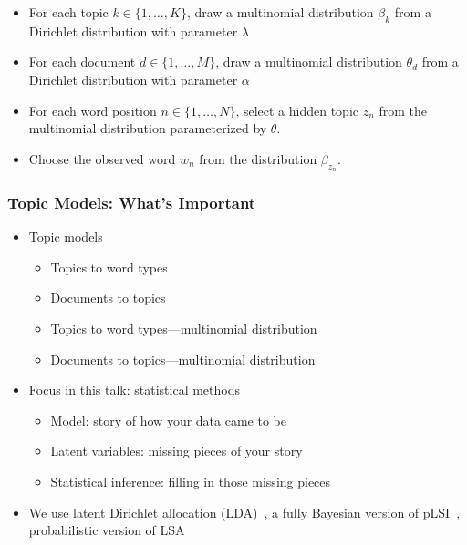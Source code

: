 {\begin{itemize}
\item<1-> For each topic $k \in \{1, \dots, K\}$, draw a multinomial distribution $\beta_k$ from a Dirichlet distribution with parameter $\lambda$
\item<2-> For each document $d \in \{1, \dots, M\}$, draw a multinomial distribution $\theta_d$ from a Dirichlet distribution with parameter $\alpha$
\item<3-> For each word position $n \in \{1, \dots, N\}$, select a hidden topic $z_n$ from the multinomial distribution parameterized by $\theta$.
\item<4-> Choose the observed word $w_n$ from the distribution $\beta_{z_n}$.
\end{itemize}

}

\fi

\begin{frame}
\frametitle{Topic Models: What's Important}
\begin{itemize}
\item Topic models 
\begin{itemize}
\ifhighlevel
	\item Topics to word types
	\item Documents to topics
\else
	\item Topics to word types---multinomial distribution
	\item Documents to topics---multinomial distribution
\fi
\end{itemize}
\item Focus in this talk: statistical methods
  \begin{itemize}
    \item Model: story of how your data came to be
    \item Latent variables: missing pieces of your story
    \item Statistical inference: filling in those missing pieces
  \end{itemize}
\item We use latent Dirichlet allocation (LDA)~\cite{blei-03}, a fully Bayesian
  version of pLSI~\cite{hofmann-99}, probabilistic version of
  LSA~\cite{landauer-97}
\end{itemize}

\end{frame}

